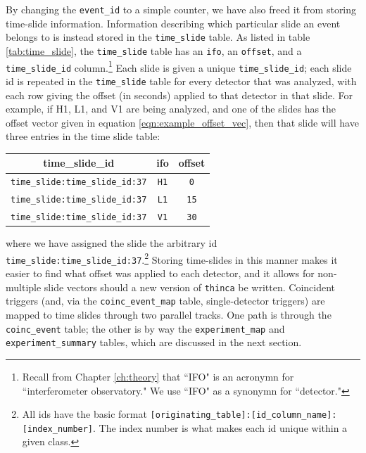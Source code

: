 By changing the \texttt{event\_id} to a simple counter, we have also freed it
from storing time-slide information. Information describing which particular
slide an event belongs to is instead stored in the \texttt{time\_slide} table.
As listed in table \ref{tab:time_slide}, the \texttt{time\_slide} table has an
\texttt{ifo}, an \texttt{offset}, and a \texttt{time\_slide\_id}
column.\footnote{Recall from Chapter \ref{ch:theory} that ``IFO" is an acronymn
for ``interferometer observatory." We use ``IFO" as a synonymn for
``detector."} Each slide is given a unique \texttt{time\_slide\_id}; each slide
id is repeated in the \texttt{time\_slide} table for every detector that was
analyzed, with each row giving the offset (in seconds) applied to that detector
in that slide. For example, if H1, L1, and V1 are being analyzed, and one of
the slides has the offset vector given in equation
\ref{eqn:example_offset_vec}, then that slide will have three entries in the
time slide table:
\begin{center}
\begin{tabular}{ c | c | c }
time\_slide\_id & ifo & offset \\
\hline\hline
\texttt{time\_slide:time\_slide\_id:37} &   \texttt{H1}    & \texttt{0} \\
\texttt{time\_slide:time\_slide\_id:37} &   \texttt{L1}    & \texttt{15} \\
\texttt{time\_slide:time\_slide\_id:37} &   \texttt{V1}    & \texttt{30} \\
\end{tabular}
\end{center}
where we have assigned the slide the arbitrary id
\texttt{time\_slide:time\_slide\_id:37}.\footnote{All ids have the basic format
\texttt{[originating\_table]:[id\_column\_name]:[index\_number]}. The index
number is what makes each id unique within a given class.} Storing time-slides
in this manner makes it easier to find what offset was applied to each
detector, and it allows for non-multiple slide vectors should a new version of
\texttt{thinca} be written. Coincident triggers (and, via the
\texttt{coinc\_event\_map} table, single-detector triggers) are mapped to time
slides through two parallel tracks. One path is through the
\texttt{coinc\_event} table; the other is by way the \texttt{experiment\_map}
and \texttt{experiment\_summary} tables, which are discussed in the next
section.

